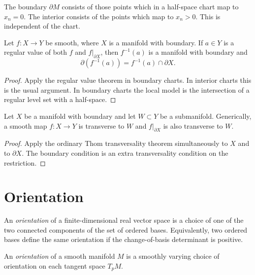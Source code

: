 \noindent
The boundary $\partial M$ consists of those
points which in a half-space chart map to
$x_n=0$.  The interior consists of the points
which map to $x_n>0$.  This is independent
of the chart.

\begin{theorem}
\label{theorem-sard-boundary}
Let $f:X\to Y$ be smooth, where $X$ is a
manifold with boundary.  If $a\in Y$ is a
regular value of both $f$ and
$f|_{\partial X}$, then $f^{-1}(a)$ is a
manifold with boundary and
$$
\partial(f^{-1}(a))=f^{-1}(a)\cap \partial X.
$$
\end{theorem}

\begin{proof}
Apply the regular value theorem in boundary
charts.  In interior charts this is the usual
argument.  In boundary charts the local model
is the intersection of a regular level set
with a half-space.
\end{proof}

\begin{theorem}
\label{theorem-thom-boundary}
Let $X$ be a manifold with boundary and let
$W\subset Y$ be a submanifold.  Generically,
a smooth map $f:X\to Y$ is transverse to
$W$ and $f|_{\partial X}$ is also transverse
to $W$.
\end{theorem}

\begin{proof}
Apply the ordinary Thom transversality
theorem simultaneously to $X$ and to
$\partial X$.  The boundary condition is an
extra transversality condition on the
restriction.
\end{proof}

\section{Orientation}
\label{section-orientation}

\begin{definition}
\label{definition-orientation-vector-space}
An {\it orientation} of a finite-dimensional
real vector space is a choice of one of the
two connected components of the set of
ordered bases.  Equivalently, two ordered
bases define the same orientation if the
change-of-basis determinant is positive.
\end{definition}

\begin{definition}
\label{definition-orientation-manifold}
An {\it orientation} of a smooth manifold
$M$ is a smoothly varying choice of
orientation on each tangent space $T_pM$.
\end{definition}

